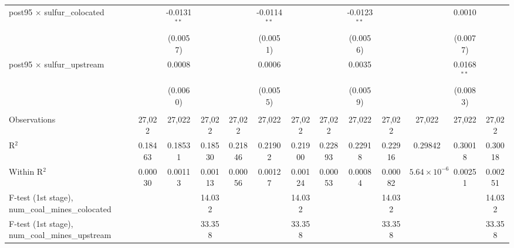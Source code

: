 \begin{table}[htbp]
\begin{adjustbox}{width = \textwidth, center}
\begin{tabular}{lcccccccccccc}
         post95 $\times$ sulfur\_colocated                  &                & -0.0131$^{**}$ &               &               & -0.0114$^{**}$ &               &               & -0.0123$^{**}$ &               &                       & 0.0010        &   \\   
                                                            &                & (0.0057)       &               &               & (0.0051)       &               &               & (0.0056)       &               &                       & (0.0077)      &   \\   
         post95 $\times$ sulfur\_upstream                   &                & 0.0008         &               &               & 0.0006         &               &               & 0.0035         &               &                       & 0.0168$^{**}$ &   \\   
                                                            &                & (0.0060)       &               &               & (0.0055)       &               &               & (0.0059)       &               &                       & (0.0083)      &   \\   
          \\
         Observations                                       & 27,022         & 27,022         & 27,022        & 27,022        & 27,022         & 27,022        & 27,022        & 27,022         & 27,022        & 27,022                & 27,022        & 27,022\\  
         R$^2$                                              & 0.18463        & 0.18531        & 0.18530       & 0.21846       & 0.21902        & 0.21900       & 0.22893       & 0.22918        & 0.22916       & 0.29842               & 0.30018       & 0.30018\\  
         Within R$^2$                                       & 0.00030        & 0.00113        & 0.00113       & 0.00056       & 0.00127        & 0.00124       & 0.00053       & 0.00084        & 0.00082       & $5.64\times 10^{-6}$  & 0.00251       & 0.00251\\  
         F-test (1st stage), num\_coal\_mines\_colocated    &                &                & 14.032        &               &                & 14.032        &               &                & 14.032        &                       &               & 14.032\\  
         F-test (1st stage), num\_coal\_mines\_upstream     &                &                & 33.358        &               &                & 33.358        &               &                & 33.358        &                       &               & 33.358\\  

\end{tabular}
\end{adjustbox}
\end{table}
